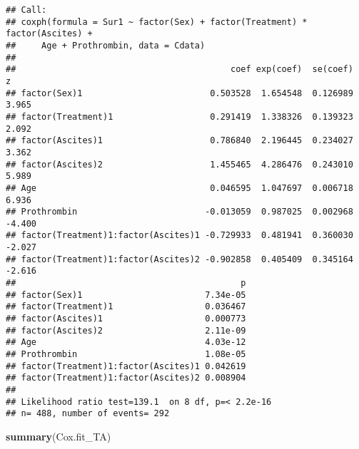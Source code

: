 \documentclass[
]{article}
\newenvironment{Shaded}{\begin{snugshade}}{\end{snugshade}}
\newcommand{\KeywordTok}[1]{\textcolor[rgb]{0.13,0.29,0.53}{\textbf{#1}}}
\newcommand{\NormalTok}[1]{#1}
\begin{document}
\begin{verbatim}
## Call:
## coxph(formula = Sur1 ~ factor(Sex) + factor(Treatment) * factor(Ascites) + 
##     Age + Prothrombin, data = Cdata)
## 
##                                          coef exp(coef)  se(coef)      z
## factor(Sex)1                         0.503528  1.654548  0.126989  3.965
## factor(Treatment)1                   0.291419  1.338326  0.139323  2.092
## factor(Ascites)1                     0.786840  2.196445  0.234027  3.362
## factor(Ascites)2                     1.455465  4.286476  0.243010  5.989
## Age                                  0.046595  1.047697  0.006718  6.936
## Prothrombin                         -0.013059  0.987025  0.002968 -4.400
## factor(Treatment)1:factor(Ascites)1 -0.729933  0.481941  0.360030 -2.027
## factor(Treatment)1:factor(Ascites)2 -0.902858  0.405409  0.345164 -2.616
##                                            p
## factor(Sex)1                        7.34e-05
## factor(Treatment)1                  0.036467
## factor(Ascites)1                    0.000773
## factor(Ascites)2                    2.11e-09
## Age                                 4.03e-12
## Prothrombin                         1.08e-05
## factor(Treatment)1:factor(Ascites)1 0.042619
## factor(Treatment)1:factor(Ascites)2 0.008904
## 
## Likelihood ratio test=139.1  on 8 df, p=< 2.2e-16
## n= 488, number of events= 292
\end{verbatim}

\begin{Shaded}
\begin{Highlighting}[]
\KeywordTok{summary}\NormalTok{(Cox.fit_TA)}
\end{Highlighting}
\end{Shaded}
\end{document}
